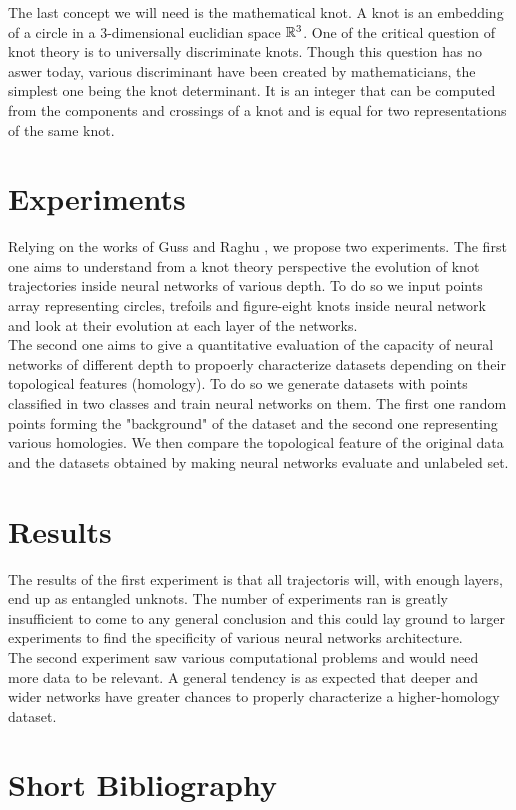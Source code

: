 \documentclass[12pt, a4paper]{article}
\begin{document}
\begin{multicols}{2}
The last concept we will need is the mathematical knot. A knot is an embedding of a circle in a $3$-dimensional euclidian space $\mathbb{R}^3$. One of the critical question of knot theory is to universally discriminate knots. Though this question has no aswer today, various discriminant have been created by mathematicians, the simplest one being the knot determinant. It is an integer that can be computed from the components and crossings of a knot and is equal for two representations of the same knot.

\section{Experiments}

Relying on the works of Guss \cite{guss_characterizing_2018} and Raghu \cite{raghu_expressive_2017}, we propose two experiments. The first one aims to understand from a knot theory perspective the evolution of knot trajectories inside neural networks of various depth. To do so we input points array representing circles, trefoils and figure-eight knots inside neural network and look at their evolution at each layer of the networks.\\

The second one aims to give a quantitative evaluation of the capacity of neural networks of different depth to propoerly characterize datasets depending on their topological features (homology). To do so we generate datasets with points classified in two classes and train neural networks on them. The first one random points forming the "background" of the dataset and the second one representing various homologies. We then compare the topological feature of the original data and the datasets obtained by making neural networks evaluate and unlabeled set. 

\section{Results}

The results of the first experiment is that all trajectoris will, with enough layers, end up as entangled unknots. The number of experiments ran is greatly insufficient to come to any general conclusion and this could lay ground to larger experiments to find the specificity of various neural networks architecture. \\

The second experiment saw various computational problems and would need more data to be relevant. A general tendency is as expected that deeper and wider networks have greater chances to properly characterize a higher-homology dataset. 


\section{Short Bibliography}





\end{multicols}
\end{document}

